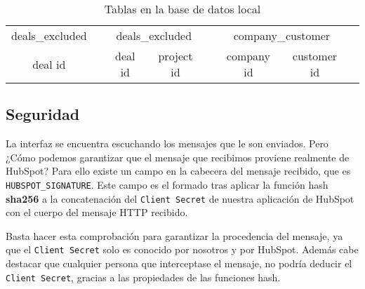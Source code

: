 \begin{itemize}[leftmargin=*]
\begin{table}
		\centering
		\begin{tabular}{
		|c|c@{\hskip 1cm} 
		|c|c|c@{\hskip 1cm} 
		|c|c|c@{\hskip 1cm}
		}
		\cline{1-1}\cline{3-4}\cline{6-7}
		deals\_excluded && \multicolumn{2}{c|}{deals\_excluded} && \multicolumn{2}{c|}{company\_customer} \\
	\cline{1-1}\cline{3-4}\cline{6-7}
	deal id && deal id & project id && company id & customer id \\
	\cline{1-1}\cline{3-4}\cline{6-7}
	\end{tabular}
	\caption{Tablas en la base de datos local}
	\label{tab:tables}
\end{table}

\end{itemize}




\subsection{Seguridad}


La interfaz se encuentra escuchando los mensajes que le son enviados. Pero ¿Cómo podemos garantizar que el mensaje que recibimos proviene realmente de HubSpot?
Para ello existe un campo en la cabecera del mensaje recibido, que es \verb|HUBSPOT_SIGNATURE|. 
Este campo es el formado tras aplicar la función hash \textbf{sha256} a la concatenación del \verb|Client Secret| de nuestra aplicación de HubSpot con el cuerpo del mensaje HTTP recibido.

Basta hacer esta comprobación para garantizar la procedencia del mensaje, ya que el \verb|Client Secret| solo es conocido por nosotros y por HubSpot. 
Además cabe destacar que cualquier persona que interceptase el mensaje, no podría deducir el \verb|Client Secret|, gracias a las propiedades de las funciones hash. 




